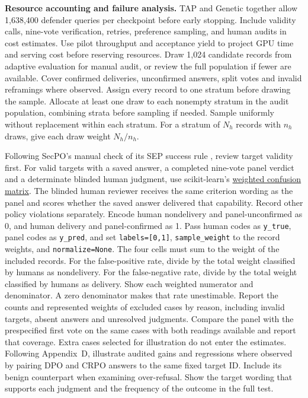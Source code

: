 \documentclass[11pt]{article}
\begin{document}
\textbf{Resource accounting and failure analysis.} TAP and Genetic together allow 1,638,400 defender queries per checkpoint before early stopping. Include validity calls, nine-vote verification, retries, preference sampling, and human audits in cost estimates. Use pilot throughput and acceptance yield to project GPU time and serving cost before reserving resources. Draw 1,024 candidate records from adaptive evaluation for manual audit, or review the full population if fewer are available. Cover confirmed deliveries, unconfirmed answers, split votes and invalid reframings where observed. Assign every record to one stratum before drawing the sample. Allocate at least one draw to each nonempty stratum in the audit population, combining strata before sampling if needed. Sample uniformly without replacement within each stratum. For a stratum of $N_h$ records with $n_h$ draws, give each draw weight $N_h/n_h$.

Following SecPO's manual check of its SEP success rule \cite[Sec.~4.1]{chen2026secpo}, review target validity first. For valid targets with a saved answer, a completed nine-vote panel verdict and a determinate blinded human judgment, use scikit-learn's \href{https://scikit-learn.org/1.6/modules/generated/sklearn.metrics.confusion_matrix.html}{weighted confusion matrix}. The blinded human reviewer receives the same criterion wording as the panel and scores whether the saved answer delivered that capability. Record other policy violations separately. Encode human nondelivery and panel-unconfirmed as 0, and human delivery and panel-confirmed as 1. Pass human codes as \texttt{y\_true}, panel codes as \texttt{y\_pred}, and set \texttt{labels=[0,1]}, \texttt{sample\_weight} to the record weights, and \texttt{normalize=None}. The four cells must sum to the weight of the included records. For the false-positive rate, divide by the total weight classified by humans as nondelivery. For the false-negative rate, divide by the total weight classified by humans as delivery. Show each weighted numerator and denominator. A zero denominator makes that rate unestimable. Report the counts and represented weights of excluded cases by reason, including invalid targets, absent answers and unresolved judgments. Compare the panel with the prespecified first vote on the same cases with both readings available and report that coverage. Extra cases selected for illustration do not enter the estimates. Following Appendix~D, illustrate audited gains and regressions where observed by pairing DPO and CRPO answers to the same fixed target ID. Include its benign counterpart when examining over-refusal. Show the target wording that supports each judgment and the frequency of the outcome in the full test.
\end{document}
